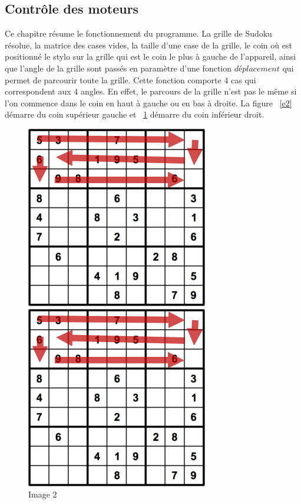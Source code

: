 \documentclass[12pt]{article}
\begin{document}
\subsection{Contrôle des moteurs}

Ce chapitre résume le fonctionnement du programme.
La grille de Sudoku résolue, la matrice des cases vides, la taille d'une case de la grille, le coin où est positionné le stylo sur la grille qui est le coin le plus à gauche de l'appareil, ainsi que l'angle de la grille sont passés en paramètre d'une fonction $déplacement$ qui permet de parcourir toute la grille. Cette fonction comporte 4 cas qui correspondent aux 4 angles. En effet, le parcours de la grille n'est pas le même si l'on commence dans le coin en haut à gauche ou en bas à droite.
La figure ~\ref{e2}  démarre du coin supérieur gauche et ~\ref{e3} démarre du coin inférieur droit.
\begin{figure}[!h]
\centering
\begin{minipage}{.5\textwidth}
  \centering
  \includegraphics[scale = 0.65]{e2.png}
  \caption{\label{e2} Image 1}
\end{minipage}%
\begin{minipage}{.5\textwidth}
  \centering
  \includegraphics[scale = 0.65]{e2.png}
  \caption{\label{e3} Image 2}
\end{minipage}
\end{figure}\\
\end{document}
